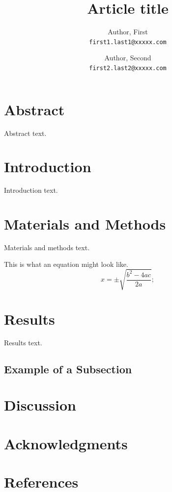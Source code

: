 \documentclass[11pt]{article}
\title{Article title}
\author{
 Author, First\\
  \texttt{first1.last1@xxxxx.com}
  \and
  Author, Second\\
  \texttt{first2.last2@xxxxx.com}
}
\date{}
\begin{document}
\maketitle



\section*{Abstract}
Abstract text.

\section*{Introduction}

Introduction text.


\section*{Materials and Methods}

Materials and methods text.

This is what an equation might look like.
\begin{equation}
x = \pm \sqrt{\frac{b^2 - 4ac}{2a}};
\end{equation}
\section*{Results}

Results text.


\subsection*{Example of a Subsection}


\section*{Discussion}



\section*{Acknowledgments}


\section*{References}
\end{document}
